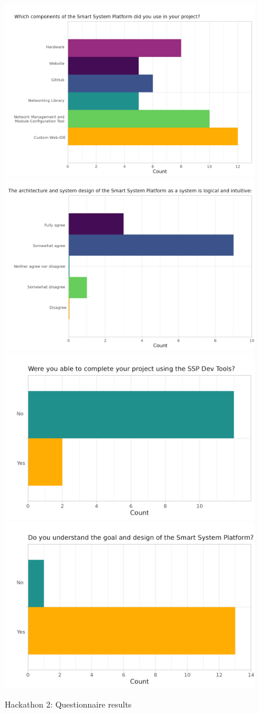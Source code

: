 \begin{figure}[H]
    \centering
    \includegraphics[width=.49\linewidth]{rstudio/survey/plots/component.png}
    \includegraphics[width=.49\linewidth]{rstudio/survey/plots/architecture.png}
    \vspace{\ftspace}
    \hspace{1.4cm}
    \includegraphics[width=.40\linewidth]{rstudio/survey/plots/completion.png}
    \hfill
    \includegraphics[width=.40\linewidth]{rstudio/survey/plots/logic.png}
    \caption{Hackathon 2: Questionnaire results}
    \label{fig:hack2_questions}
\end{figure}


